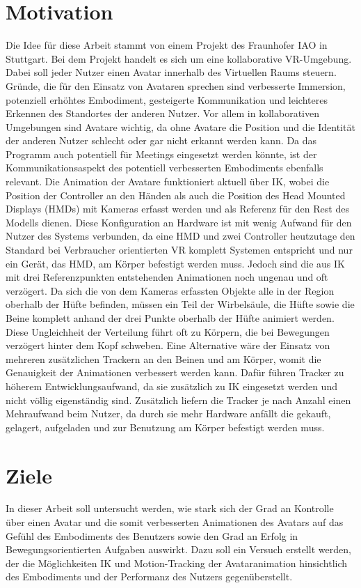 \section{Motivation}
Die Idee für diese Arbeit stammt von einem Projekt des Fraunhofer IAO in Stuttgart. Bei dem Projekt handelt es sich um eine kollaborative VR-Umgebung. Dabei soll jeder Nutzer einen Avatar innerhalb des Virtuellen Raums steuern. 
Gründe, die für den Einsatz von Avataren sprechen sind verbesserte Immersion, potenziell erhöhtes Embodiment, gesteigerte Kommunikation und leichteres Erkennen des Standortes der anderen Nutzer. Vor allem in kollaborativen Umgebungen sind Avatare wichtig, da ohne Avatare die Position und die Identität der anderen Nutzer schlecht oder gar nicht erkannt werden kann. Da das Programm auch potentiell für Meetings eingesetzt werden könnte, ist der Kommunikationsaspekt des potentiell verbesserten Embodiments ebenfalls relevant. Die Animation der Avatare funktioniert aktuell über IK, wobei die Position der Controller an den Händen als auch die Position des Head Mounted Displays (HMDs) mit Kameras erfasst werden und als Referenz für den Rest des Modells dienen. Diese Konfiguration an Hardware ist mit wenig Aufwand für den Nutzer des Systems verbunden, da eine HMD und zwei Controller heutzutage den Standard bei Verbraucher orientierten VR komplett Systemen entspricht und nur ein Gerät, das HMD, am Körper befestigt werden muss. Jedoch sind die aus IK mit drei Referenzpunkten entstehenden Animationen noch ungenau und oft verzögert. Da sich die von dem Kameras erfassten Objekte alle in der Region oberhalb der Hüfte befinden, müssen ein Teil der Wirbelsäule, die Hüfte sowie die Beine komplett anhand der drei Punkte oberhalb der Hüfte animiert werden. Diese Ungleichheit der Verteilung führt oft zu Körpern, die bei Bewegungen verzögert hinter dem Kopf schweben.
Eine Alternative wäre der Einsatz von mehreren zusätzlichen Trackern an den Beinen und am Körper, womit die Genauigkeit der Animationen verbessert werden kann. Dafür führen Tracker zu höherem Entwicklungsaufwand, da sie zusätzlich zu IK eingesetzt werden und nicht völlig eigenständig sind. Zusätzlich liefern die Tracker je nach Anzahl einen Mehraufwand beim Nutzer, da durch sie mehr Hardware anfällt die gekauft, gelagert, aufgeladen und zur Benutzung am Körper befestigt werden muss.


\section{Ziele}
In dieser Arbeit soll untersucht werden, wie stark sich der Grad an Kontrolle über einen Avatar und die somit verbesserten Animationen des Avatars auf das Gefühl des Embodiments des Benutzers  sowie den Grad an Erfolg in Bewegungsorientierten Aufgaben auswirkt. Dazu soll ein Versuch erstellt werden, der die Möglichkeiten IK und Motion-Tracking der Avataranimation hinsichtlich des Embodiments und der Performanz des Nutzers gegenüberstellt.


